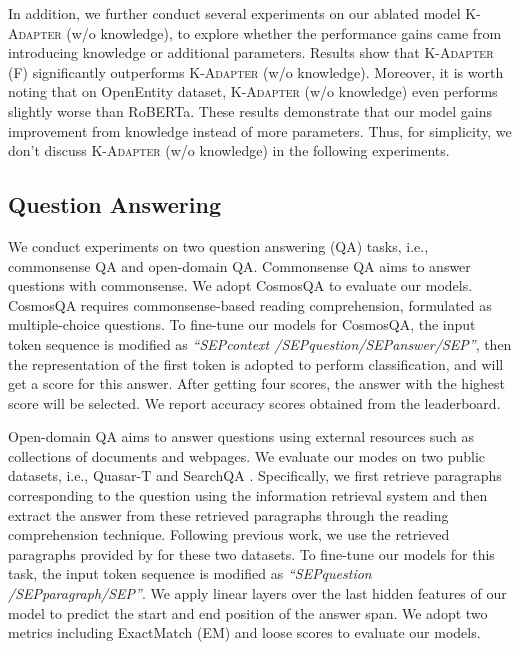 \documentclass[11pt,a4paper]{article}
\begin{document}
In addition, we further conduct several experiments on our ablated model \textsc{K-Adapter} (w/o knowledge), to explore whether the performance gains came from introducing knowledge or additional parameters.
Results show that \textsc{K-Adapter} (F) significantly outperforms \textsc{K-Adapter} (w/o knowledge). Moreover, it is worth noting that on OpenEntity dataset, \textsc{K-Adapter} (w/o knowledge) even performs slightly worse than RoBERTa. 
These results demonstrate that our model gains improvement from knowledge instead of more parameters. Thus, for simplicity, we don't discuss \textsc{K-Adapter} (w/o knowledge) in the following experiments.








\subsection{Question Answering}
We conduct experiments on two question answering (QA) tasks, i.e., commonsense QA and open-domain QA. Commonsense QA aims to answer questions with commonsense. We adopt CosmosQA \citep{huang2019cosmos} to evaluate our models. CosmosQA requires commonsense-based reading comprehension, formulated as multiple-choice questions. To fine-tune our models for CosmosQA, the input token sequence is modified as \textit{``SEPcontext /SEPquestion/SEPanswer/SEP''}, then the representation of the first token is adopted to perform classification, and will get a score for this answer. After getting four scores, the answer with the highest score will be selected. We report accuracy scores obtained from the leaderboard. 

Open-domain QA aims to answer questions using external resources such as collections of documents and webpages. We evaluate our modes on two public datasets, i.e., Quasar-T \citep{dhingra2017quasar} and SearchQA \citep{dunn2017searchqa}. 
Specifically, we first retrieve paragraphs corresponding to the question using the information retrieval system and then extract the answer from these retrieved paragraphs through the reading comprehension technique. Following previous work\citep{lin2018denoising}, we use the retrieved paragraphs provided by \citet{wang2017gated} for these two datasets. To fine-tune our models for this task, the input token sequence is modified as \textit{``SEPquestion /SEPparagraph/SEP''}. We apply linear layers over the last hidden features of our model to predict the start and end position of the answer span. We adopt two metrics including ExactMatch (EM) and loose  \citep{lingW12} scores to evaluate our models. 
\end{document}
